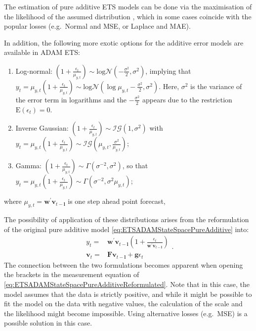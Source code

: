 \documentclass[]{book}
\providecommand{\tightlist}{%
  \setlength{\itemsep}{0pt}\setlength{\parskip}{0pt}}
\theoremstyle{definition}
\theoremstyle{definition}
\theoremstyle{definition}
\theoremstyle{definition}
\theoremstyle{remark}
\begin{document}
The estimation of pure additive ETS models can be done via the maximisation of the likelihood of the assumed distribution \citep[see Chapter 13 of][]{SvetunkovSBA}, which in some cases coincide with the popular losses (e.g.~Normal and MSE, or Laplace and MAE).

In addition, the following more exotic options for the additive error models are available in ADAM ETS:

\begin{enumerate}
\def\labelenumi{\arabic{enumi}.}
\tightlist
\item
  Log-normal: \(\left(1+\frac{\epsilon_t}{\mu_{y,t}} \right) \sim \text{log}\mathcal{N}\left(-\frac{\sigma^2}{2}, \sigma^2\right)\), implying that \(y_t = \mu_{y,t} \left(1+\frac{\epsilon_t}{\mu_{y,t}} \right) \sim \text{log}\mathcal{N}\left(\log\mu_{y,t} -\frac{\sigma^2}{2}, \sigma^2\right)\).
  Here, \(\sigma^2\) is the variance of the error term in logarithms and the \(-\frac{\sigma^2}{2}\) appears due to the restriction \(\text{E}(\epsilon_t)=0\).
\item
  Inverse Gaussian: \(\left(1+\frac{\epsilon_t}{\mu_{y,t}} \right) \sim \mathcal{IG}(1, \sigma^2)\) with \(y_t=\mu_{y,t} \left(1+\frac{\epsilon_t}{\mu_{y,t}} \right) \sim \mathcal{IG}\left(\mu_{y,t}, \frac{\sigma^2}{\mu_{y,t}}\right)\);
\item
  Gamma: \(\left(1+\frac{\epsilon_t}{\mu_{y,t}} \right) \sim \mathcal{\Gamma}(\sigma^{-2}, \sigma^2)\), so that \(y_t = \mu_{y,t} \left(1+\frac{\epsilon_t}{\mu_{y,t}} \right) \sim \mathcal{\Gamma}(\sigma^{-2}, \sigma^2 \mu_{y,t})\);
\end{enumerate}

where \(\mu_{y,t} = \mathbf{w}^\prime \mathbf{v}_{t-\mathbf{l}}\) is one step ahead point forecast,

The possibility of application of these distributions arises from the reformulation of the original pure additive model \eqref{eq:ETSADAMStateSpacePureAdditive} into:
\begin{equation}
  \begin{aligned}
    {y}_{t} = &\mathbf{w}^\prime \mathbf{v}_{t-\mathbf{l}}\left(1 + \frac{\epsilon_t}{\mathbf{w}^\prime \mathbf{v}_{t-\mathbf{l}}}\right) \\
    \mathbf{v}_{t} = &\mathbf{F} \mathbf{v}_{t-\mathbf{l}} + \mathbf{g} \epsilon_t
  \end{aligned}.
  \label{eq:ETSADAMStateSpacePureAdditiveReformulated}
\end{equation}
The connection between the two formulations becomes apparent when opening the brackets in the measurement equation of \eqref{eq:ETSADAMStateSpacePureAdditiveReformulated}. Note that in this case, the model assumes that the data is strictly positive, and while it might be possible to fit the model on the data with negative values, the calculation of the scale and the likelihood might become impossible. Using alternative losses (e.g.~MSE) is a possible solution in this case.
\end{document}
